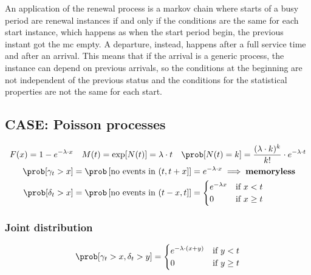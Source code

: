 An application of the renewal process is a markov chain where starts of a busy period are renewal instances if and only if
the conditions are the same for each start instance, which happens as when the start period begin, the previous instant got the mc empty.
A departure, instead, happens after a full service time and after an arrival. This means that if the arrival is a generic process, the instance
can depend on previous arrivals, so the conditions at the beginning are not independent of the previous status and the conditions
for the statistical properties are not the same for each start.

\subsection{CASE: Poisson processes}
\begin{equation}
  \begin{split}
    F(x)=1-e^{-\lambda \cdot x} &\quad M(t)=\exp[N(t)]=\lambda \cdot t \quad \prob[N(t)=k]=\frac{(\lambda \cdot k)^k}{k!}\cdot e^{-\lambda \cdot t}\\
    \prob[\gamma_t > x]&=\prob\left[\text{no events in } (t,t+x] \right]=e^{-\lambda \cdot x} \implies \text{\textbf{memoryless}}\\
    \prob[\delta_t > x] &= \prob \left[\text{no events in }(t-x,t] \right]=
    \begin{cases}
      e^{-\lambda x} & \text{if } x < t \\
      0 & \text{if } x \ge t\\
    \end{cases}
  \end{split}
\end{equation}

\subsubsection{Joint distribution}
\begin{equation}
  \prob[\gamma_t > x, \delta_t > y ] =
  \begin{cases}
    e^{-\lambda \cdot (x+y)} & \text{if } y < t \\
    0     & \text{if } y \ge t \\
  \end{cases}
\end{equation}

